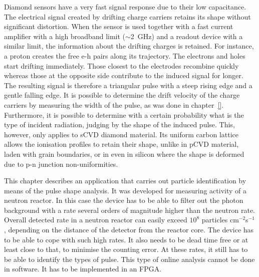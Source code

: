 

Diamond sensors have a very fast signal response due to their low capacitance. The electrical signal created by drifting charge carriers retains its shape without significant distortion. When the sensor is used together with a fast current amplifier with a high broadband limit ($\sim$2~GHz) and a readout device with a similar limit, the information about the drifting charges is retained. For instance, a proton creates the free e-h pairs along its trajectory. The electrons and holes start drifting immediately. Those closest to the electrodes recombine quickly whereas those at the opposite side contribute to the induced signal for longer.  The resulting signal is therefore a triangular pulse with a steep rising edge and a gentle falling edge. It is possible to determine the drift velocity of the charge carriers by measuring the width of the pulse, as was done in chapter~\ref{}. Furthermore, it is possible to determine with a certain probability what is the type of incident radiation, judging by the shape of the induced pulse. This, however, only applies to sCVD diamond material. Its uniform carbon lattice allows the ionisation profiles to retain their shape, unlike in pCVD material, laden with grain boundaries, or in even in silicon where the shape is deformed due to p-n junction non-uniformities.

This chapter describes an application that carries out particle identification by means of the pulse shape analysis. It was developed for measuring activity of a neutron reactor. In this case the device has to be able to filter out the photon background with a rate several orders of magnitude higher than the neutron rate. Overall detected rate in a neutron reactor can easily exceed $10^8$ particles cm$^{-2}$s$^{-1}$, depending on the distance of the detector from the reactor core. The device has to be able to cope with such high rates. It also needs to be dead time free or at least close to that, to minimise the counting error. At these rates, it still has to be able to identify the types of pulse. This type of online analysis cannot be done in software. It has to be implemented in an FPGA.







